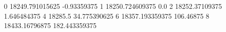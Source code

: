 0 18249.791015625 -0.93359375
1 18250.724609375 0.0
2 18252.37109375 1.646484375
4 18285.5 34.775390625
6 18357.193359375 106.46875
8 18433.16796875 182.443359375
